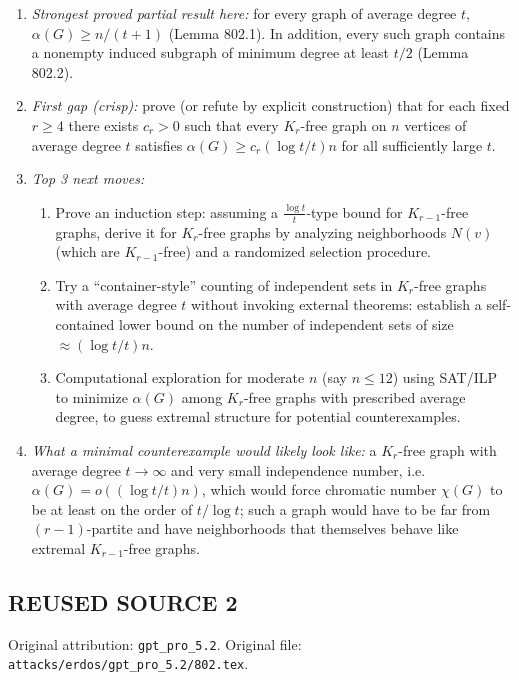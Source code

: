 \begin{enumerate}
\item[(i)] \emph{Strongest proved partial result here:} for every graph of average degree $t$, $\alpha(G)\ge n/(t+1)$ (Lemma 802.1). In addition, every such graph contains a nonempty induced subgraph of minimum degree at least $t/2$ (Lemma 802.2).
\item[(ii)] \emph{First gap (crisp):} prove (or refute by explicit construction) that for each fixed $r\ge 4$ there exists $c_r>0$ such that every $K_r$-free graph on $n$ vertices of average degree $t$ satisfies $\alpha(G)\ge c_r (\log t/t)n$ for all sufficiently large $t$.
\item[(iii)] \emph{Top 3 next moves:}
  \begin{enumerate}
  \item Prove an induction step: assuming a $\frac{\log t}{t}$-type bound for $K_{r-1}$-free graphs, derive it for $K_r$-free graphs by analyzing neighborhoods $N(v)$ (which are $K_{r-1}$-free) and a randomized selection procedure.
  \item Try a ``container-style'' counting of independent sets in $K_r$-free graphs with average degree $t$ without invoking external theorems: establish a self-contained lower bound on the number of independent sets of size $\approx (\log t/t)n$.
  \item Computational exploration for moderate $n$ (say $n\le 12$) using SAT/ILP to minimize $\alpha(G)$ among $K_r$-free graphs with prescribed average degree, to guess extremal structure for potential counterexamples.
  \end{enumerate}
\item[(iv)] \emph{What a minimal counterexample would likely look like:} a $K_r$-free graph with average degree $t\to\infty$ and very small independence number, i.e. $\alpha(G)=o((\log t/t)n)$, which would force chromatic number $\chi(G)$ to be at least on the order of $t/\log t$; such a graph would have to be far from $(r-1)$-partite and have neighborhoods that themselves behave like extremal $K_{r-1}$-free graphs.
\end{enumerate}




\subsection*{REUSED SOURCE 2}
Original attribution: \texttt{gpt\_pro\_5.2}.
Original file: \texttt{attacks/erdos/gpt\_pro\_5.2/802.tex}.

